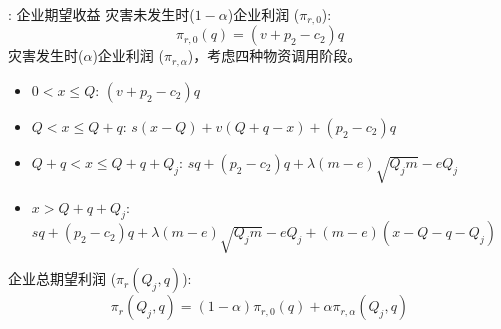 \documentclass[9pt]{beamer}
\begin{document}
\begin{frame}{\insertsectionhead: 企业期望收益}
    灾害未发生时($1-\alpha$)企业利润 ($\pi_{r,0}$):
    \begin{equation} \label{eq:beamer_enterprise_profit_no_disaster}
    {\pi}_{r,0}(q) = (v + p_2 - c_2)q
    \end{equation}
    灾害发生时($\alpha$)企业利润 ($\pi_{r,\alpha}$)，考虑四种物资调用阶段。
    \begin{itemize}
        \item $0 < x \leq Q$: $(v + p_2 - c_2)q$
        \item $Q < x \leq Q+q$: $s(x-Q) + v(Q + q - x) + (p_2 - c_2)q$
        \item $Q+q < x \leq Q+q+Q_j$: $sq + (p_2 - c_2)q + \lambda(m-e)\sqrt{Q_jm} - eQ_j$
        \item $x > Q+q+Q_j$: $sq + (p_2 - c_2)q + \lambda(m-e)\sqrt{Q_jm} - eQ_j + (m-e)(x-Q-q-Q_j)$
    \end{itemize}
    企业总期望利润 (${\pi}_r(Q_j,q)$):
    \begin{equation} \label{eq:beamer_enterprise_expected_profit}
    {\pi}_r(Q_j,q) = (1-\alpha){\pi}_{r,0}(q) + \alpha{\pi}_{r,\alpha}(Q_j,q)
    \end{equation}
   
\end{frame}
\end{document}

